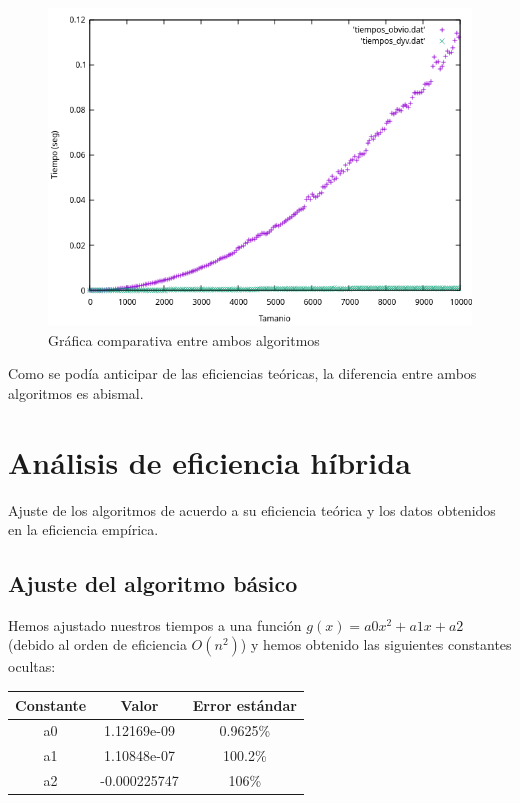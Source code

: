 \documentclass{article}
\begin{document}
	\begin{figure}[H]
		\centering
		\includegraphics[totalheight=8cm]{img/comparacion}
		\caption{Gráfica comparativa entre ambos algoritmos}
		\label{fig:comparacion}
	\end{figure}

	Como se podía anticipar de las eficiencias teóricas, la diferencia entre ambos algoritmos es abismal. 
	
	\section{Análisis de eficiencia híbrida}
	Ajuste de los algoritmos de acuerdo a su eficiencia teórica y los datos obtenidos en la eficiencia empírica.
	
	\subsection{Ajuste del algoritmo básico}
	Hemos ajustado nuestros tiempos a una función $g(x)=a0x^2+a1x+a2$ (debido al orden de eficiencia $O(n^2)$) y hemos obtenido las siguientes constantes ocultas:
	
	\begin{longtable}{|c|c|c|}
		\hline
		Constante		& Valor			& Error estándar	\\ \hline
		a0              & 1.12169e-09	& 0.9625\% \\ \hline
		a1              & 1.10848e-07	& 100.2\%	 \\ \hline
		a2              & -0.000225747	& 106\%	 \\ \hline
	\end{longtable}
\end{document}
